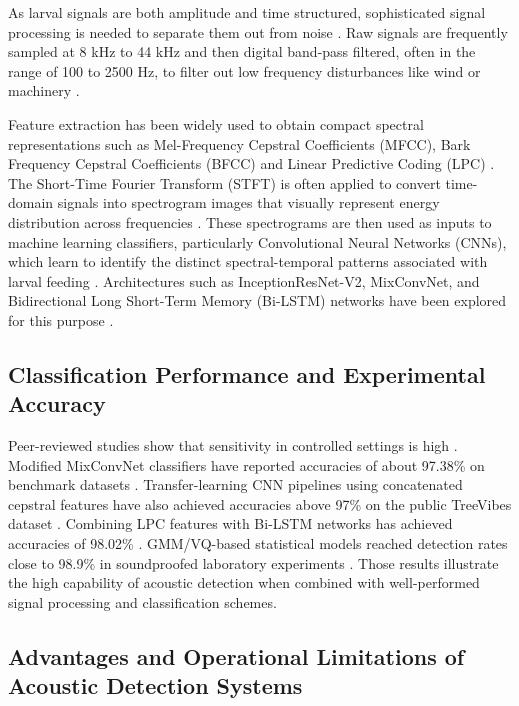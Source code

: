 \documentclass[12pt,a4paper,oneside]{memoir}
\begin{document}
As larval signals are both amplitude and time structured, sophisticated signal processing is needed to separate them out from noise \cite{karar2021,saranya2025}. Raw signals are frequently sampled at 8 kHz to 44 kHz and then digital band-pass filtered, often in the range of 100 to 2500 Hz, to filter out low frequency disturbances like wind or machinery \cite{karar2022,pinhas2008,saranya2025}.

Feature extraction has been widely used to obtain compact spectral representations such as Mel-Frequency Cepstral Coefficients (MFCC), Bark Frequency Cepstral Coefficients (BFCC) and Linear Predictive Coding (LPC) \cite{saleem2022,saranya2025}. The Short-Time Fourier Transform (STFT) is often applied to convert time-domain signals into spectrogram images that visually represent energy distribution across frequencies \cite{karar2022,saranya2025}. These spectrograms are then used as inputs to machine learning classifiers, particularly Convolutional Neural Networks (CNNs), which learn to identify the distinct spectral-temporal patterns associated with larval feeding \cite{karar2022,saranya2025}. Architectures such as InceptionResNet-V2, MixConvNet, and Bidirectional Long Short-Term Memory (Bi-LSTM) networks have been explored for this purpose \cite{karar2021,karar2022,saranya2025}.

\subsection{Classification Performance and Experimental Accuracy}

Peer-reviewed studies show that sensitivity in controlled settings is high \cite{karar2021,karar2022,saranya2025}. Modified MixConvNet classifiers have reported accuracies of about 97.38\% on benchmark datasets \cite{karar2022}. Transfer-learning CNN pipelines using concatenated cepstral features have also achieved accuracies above 97\% on the public TreeVibes dataset \cite{boulila2023}. Combining LPC features with Bi-LSTM networks has achieved accuracies of 98.02\% \cite{saranya2025}. GMM/VQ-based statistical models reached detection rates close to 98.9\% in soundproofed laboratory experiments \cite{pinhas2008}. Those results illustrate the high capability of acoustic detection when combined with well-performed signal processing and classification schemes.

\subsection{Advantages and Operational Limitations of Acoustic Detection Systems}
\end{document}
